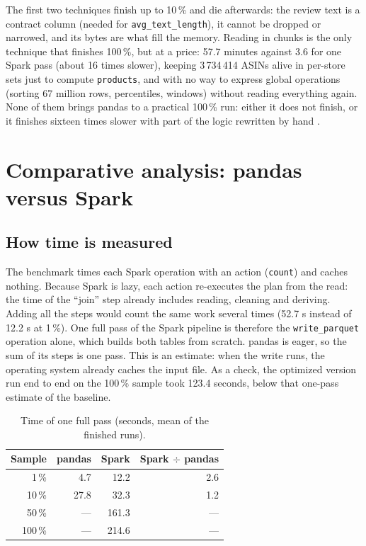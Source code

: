 \documentclass[11pt,a4paper]{article}
\begin{document}
The first two techniques finish up to 10\,\% and die afterwards: the review text is a contract
column (needed for \texttt{avg\_text\_length}), it cannot be dropped or narrowed, and its bytes
are what fill the memory. Reading in chunks is the only technique that finishes 100\,\%, but at
a price: 57.7 minutes against 3.6 for one Spark pass (about 16 times slower), keeping
3\,734\,414 ASINs alive in per-store sets just to compute \texttt{products}, and with no way to
express global operations (sorting 67 million rows, percentiles, windows) without reading
everything again. None of them brings pandas to a practical 100\,\% run: either it does not
finish, or it finishes sixteen times slower with part of the logic rewritten by hand
\cite{pandasscale}.

\section{Comparative analysis: pandas versus Spark}

\subsection{How time is measured}

The benchmark times each Spark operation with an action (\texttt{count}) and caches nothing.
Because Spark is lazy, each action re-executes the plan from the read: the time of the
``join'' step already includes reading, cleaning and deriving. Adding all the steps would
count the same work several times (52.7 s instead of 12.2 s at 1\,\%). One full pass of the
Spark pipeline is therefore the \texttt{write\_parquet} operation alone, which builds both
tables from scratch. pandas is eager, so the sum of its steps is one pass. This is an
estimate: when the write runs, the operating system already caches the input file.
As a check, the optimized version run end to end on the 100\,\% sample took 123.4 seconds,
below that one-pass estimate of the baseline.

\begin{table}[H]
\centering
\caption{Time of one full pass (seconds, mean of the finished runs).}
\label{tab:time}
\begin{tabular}{rrrr}
\toprule
Sample & pandas & Spark & Spark $\div$ pandas \\
\midrule
1\,\%   & 4.7  & 12.2  & 2.6 \\
10\,\%  & 27.8 & 32.3  & 1.2 \\
50\,\%  & ---  & 161.3 & --- \\
100\,\% & ---  & 214.6 & --- \\
\bottomrule
\end{tabular}
\end{table}
\end{document}
